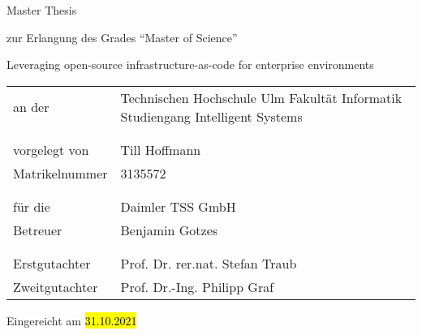 \begin{titlepage}
  \vspace*{4cm}

  {\normalfont\sffamily\huge Master Thesis}

  \vspace{0.5cm}
  zur Erlangung des Grades \enquote{Master of Science}

  \vspace{2.0cm}
  {\normalfont\sffamily\large Leveraging open-source infrastructure-as-code for enterprise environments}

  \bigskip

  \begin{tabular}{ @{} p{} p{} }
      an der & Technischen Hochschule Ulm
      \newline
      Fakultät Informatik
      \newline
      Studiengang Intelligent Systems  \\
      & \\
      & \\
      vorgelegt von & Till Hoffmann \\
      Matrikelnummer & 3135572 \\
      & \\
      & \\
      für die & Daimler TSS GmbH \\
      Betreuer & Benjamin Gotzes \\
      & \\
      & \\
      Erstgutachter & Prof. Dr. rer.nat. Stefan Traub \\
      Zweitgutachter & Prof. Dr.-Ing. Philipp Graf \\
  \end{tabular}

  \vspace{1cm}
  
  Eingereicht am \hl{31.10.2021}

\end{titlepage}

